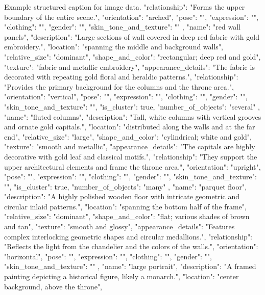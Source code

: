 \begin{captionexample}{Example structured caption for image data.}
{{      "relationship": "Forms the upper boundary of the entire scene.",
      "orientation": "arched",
      "pose": "",
      "expression": "",
      "clothing": "",
      "gender": "",
      "skin_tone_and_texture": ""
    },
    {
      "name": "red wall panels",
      "description": "Large sections of wall covered in deep red fabric with gold embroidery.",
      "location": "spanning the middle and background walls",
      "relative_size": "dominant",
      "shape_and_color": "rectangular; deep red and gold",
      "texture": "fabric and metallic embroidery",
      "appearance_details": "The fabric is decorated with repeating gold floral and heraldic patterns.",
      "relationship": "Provides the primary background for the columns and the throne area.",
      "orientation": "vertical",
      "pose": "",
      "expression": "",
      "clothing": "",
      "gender": "",
      "skin_tone_and_texture": "",
      "is_cluster": true,
      "number_of_objects": "several"
    },
    {
      "name": "fluted columns",
      "description": "Tall, white columns with vertical grooves and ornate gold capitals.",
      "location": "distributed along the walls and at the far end",
      "relative_size": "large",
      "shape_and_color": "cylindrical; white and gold",
      "texture": "smooth and metallic",
      "appearance_details": "The capitals are highly decorative with gold leaf and classical motifs.",
      "relationship": "They support the upper architectural elements and frame the throne area.",
      "orientation": "upright",
      "pose": "",
      "expression": "",
      "clothing": "",
      "gender": "",
      "skin_tone_and_texture": "",
      "is_cluster": true,
      "number_of_objects": "many"
    },
    {
      "name": "parquet floor",
      "description": "A highly polished wooden floor with intricate geometric and circular inlaid patterns.",
      "location": "spanning the bottom half of the frame",
      "relative_size": "dominant",
      "shape_and_color": "flat; various shades of brown and tan",
      "texture": "smooth and glossy",
      "appearance_details": "Features complex interlocking geometric shapes and circular medallions.",
      "relationship": "Reflects the light from the chandelier and the colors of the walls.",
      "orientation": "horizontal",
      "pose": "",
      "expression": "",
      "clothing": "",
      "gender": "",
      "skin_tone_and_texture": ""
    },
    {
      "name": "large portrait",
      "description": "A framed painting depicting a historical figure, likely a monarch.",
      "location": "center background, above the throne",
}}
\end{captionexample}

